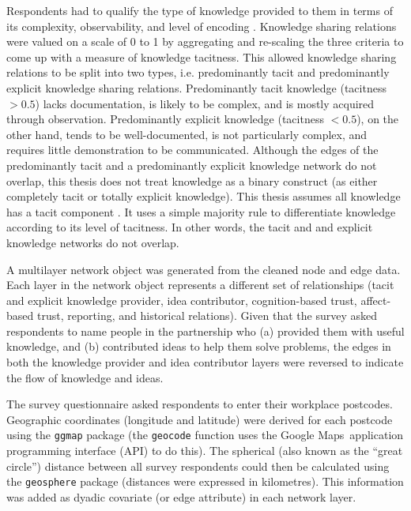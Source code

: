 Respondents had to qualify the type of knowledge provided to them in terms of its complexity, observability, and level of encoding \citep{winter1987knowledge,zander1995knowledge,cavusgil2003tacit}. Knowledge sharing relations were valued on a scale of 0 to 1 by aggregating and re-scaling the three criteria to come up with a measure of knowledge tacitness. This allowed knowledge sharing relations to be split into two types, i.e. predominantly tacit and predominantly explicit knowledge sharing relations. Predominantly tacit knowledge (tacitness $> 0.5$) lacks documentation, is likely to be complex, and is mostly acquired through observation. Predominantly explicit knowledge (tacitness $< 0.5$), on the other hand, tends to be well-documented, is not particularly complex, and requires little demonstration to be communicated. Although the edges of the predominantly tacit and a predominantly explicit knowledge network do not overlap, this thesis does not treat knowledge as a binary construct (as either completely tacit or totally explicit knowledge). This thesis assumes all knowledge has a tacit component \citep{inkpen1998knowledge}. It uses a simple majority rule to differentiate knowledge according to its level of tacitness. In other words, the tacit and and explicit knowledge networks do not overlap. \medskip

A multilayer network object was generated from the cleaned node and edge data. Each layer in the network object represents a different set of relationships (tacit and explicit knowledge provider, idea contributor, cognition-based trust, affect-based trust, reporting, and historical relations). Given that the survey asked respondents to name people in the partnership who (a) provided them with useful knowledge, and (b) contributed ideas to help them solve problems, the edges in both the knowledge provider and idea contributor layers were reversed to indicate the flow of knowledge and ideas. \medskip

The survey questionnaire asked respondents to enter their workplace postcodes. Geographic coordinates (longitude and latitude) were derived for each postcode using the \texttt{ggmap} package (the \texttt{geocode} function uses the Google Maps\texttrademark\ application programming interface (API) to do this). The spherical (also known as the \enquote{great circle}) distance between all survey respondents could then be calculated using the \texttt{geosphere} package (distances were expressed in kilometres). This information was added as dyadic covariate (or edge attribute) in each network layer. \medskip

